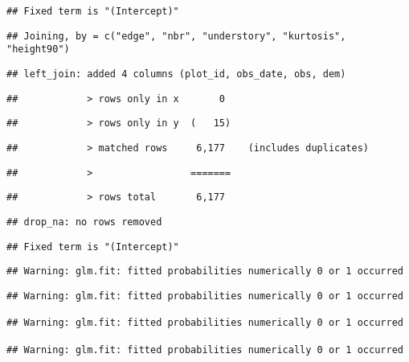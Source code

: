 \documentclass[
]{article}
\begin{document}
\begin{verbatim}
## Fixed term is "(Intercept)"
\end{verbatim}

\begin{verbatim}
## Joining, by = c("edge", "nbr", "understory", "kurtosis", "height90")
\end{verbatim}

\begin{verbatim}
## left_join: added 4 columns (plot_id, obs_date, obs, dem)
\end{verbatim}

\begin{verbatim}
##            > rows only in x       0
\end{verbatim}

\begin{verbatim}
##            > rows only in y  (   15)
\end{verbatim}

\begin{verbatim}
##            > matched rows     6,177    (includes duplicates)
\end{verbatim}

\begin{verbatim}
##            >                 =======
\end{verbatim}

\begin{verbatim}
##            > rows total       6,177
\end{verbatim}

\begin{verbatim}
## drop_na: no rows removed
\end{verbatim}

\begin{verbatim}
## Fixed term is "(Intercept)"
\end{verbatim}

\begin{verbatim}
## Warning: glm.fit: fitted probabilities numerically 0 or 1 occurred
\end{verbatim}

\begin{verbatim}
## Warning: glm.fit: fitted probabilities numerically 0 or 1 occurred

## Warning: glm.fit: fitted probabilities numerically 0 or 1 occurred

## Warning: glm.fit: fitted probabilities numerically 0 or 1 occurred
\end{verbatim}
\end{document}
